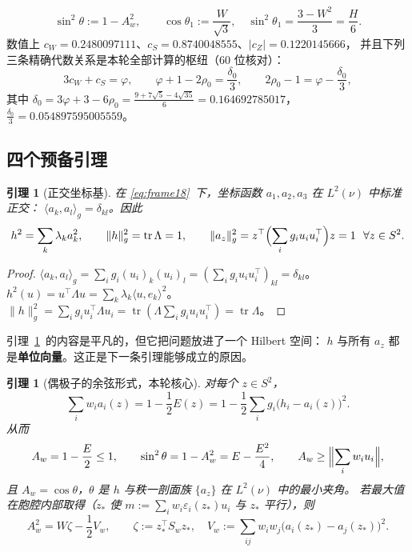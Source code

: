 \documentclass[UTF8,11pt]{ctexart}
\newtheorem{lemma}[theorem]{引理}
\theoremstyle{definition}
\newcommand{\Lam}{\Lambda}
\newcommand{\tr}{\operatorname{tr}}
\begin{document}
\begin{equation}\label{eq:r25ang}
\sin^2\theta:=1-A_w^2,\qquad
\cos\theta_1:=\frac{W}{\sqrt3},\quad \sin^2\theta_1=\frac{3-W^2}3=\frac H6 .
\end{equation}
数值上 $c_W=0.2480097111$、$c_S=0.8740048555$、$|c_Z|=0.1220145666$，
并且下列三条精确代数关系是本轮全部计算的枢纽（$60$ 位核对）：
\begin{equation}\label{eq:r25alg}
3c_W+c_S=\varphi,\qquad
\varphi+1-2\rho_0=\frac{\delta_0}3,\qquad
2\rho_0-1=\varphi-\frac{\delta_0}3 ,
\end{equation}
其中 $\delta_0=3\varphi+3-6\rho_0=\frac{9+7\sqrt5-4\sqrt{35}}6=0.164692785017$，
$\frac{\delta_0}3=0.054897595005559$。

\subsection{四个预备引理}\label{sec:r25:lem}

\begin{lemma}[正交坐标基]\label{lem:r25ortho}
在 \eqref{eq:frame18}~下，坐标函数 $a_1,a_2,a_3$ 在 $L^2(\nu)$ 中标准正交：
$\langle a_k,a_l\rangle_g=\delta_{kl}$。因此
\begin{equation}\label{eq:r25ortho1}
h^2=\sum_k\lambda_ka_k^2,\qquad \|h\|_g^2=\tr\Lam=1,\qquad
\|a_z\|_g^2=z^\top\Bigl(\sum_ig_iu_iu_i^\top\Bigr)z=1\ \ \forall z\in S^2 .
\end{equation}
\end{lemma}

\begin{proof}
$\langle a_k,a_l\rangle_g=\sum_ig_i(u_i)_k(u_i)_l=(\sum_ig_iu_iu_i^\top)_{kl}=\delta_{kl}$。
$h^2(u)=u^\top\Lam u=\sum_k\lambda_k\langle u,e_k\rangle^2$。
$\|h\|_g^2=\sum_ig_iu_i^\top\Lam u_i=\tr(\Lam\sum_ig_iu_iu_i^\top)=\tr\Lam$。
\end{proof}

引理~\ref{lem:r25ortho}~的内容是平凡的，但它把问题放进了一个 Hilbert 空间：
$h$ 与所有 $a_z$ 都是\textbf{单位向量}。这正是下一条引理能够成立的原因。

\begin{lemma}[偶极子的余弦形式，本轮核心]\label{lem:r25dipole}
对每个 $z\in S^2$，
\begin{equation}\label{eq:r25dip1}
\sum_iw_ia_i(z)=1-\frac12E(z)=1-\frac12\sum_ig_i\bigl(h_i-a_i(z)\bigr)^2 .
\end{equation}
从而
\begin{equation}\label{eq:r25dip2}
A_w=1-\frac E2\le1,\qquad
\sin^2\theta=1-A_w^2=E-\frac{E^2}4,\qquad
A_w\ge\Bigl\|\sum_iw_iu_i\Bigr\| ,
\end{equation}
且 $A_w=\cos\theta$，$\theta$ 是 $h$ 与秩一剖面族 $\{a_z\}$ 在 $L^2(\nu)$ 中的最小夹角。
若最大值在胞腔内部取得（$z_*$ 使 $m:=\sum_iw_i\varepsilon_i(z_*)u_i$ 与 $z_*$ 平行），则
\begin{equation}\label{eq:r25dip3}
A_w^2=W\zeta-\frac12V_w,\qquad
\zeta:=z_*^\top S_wz_*,\quad V_w:=\sum_{ij}w_iw_j\bigl(a_i(z_*)-a_j(z_*)\bigr)^2 .
\end{equation}
\end{lemma}
\end{document}
